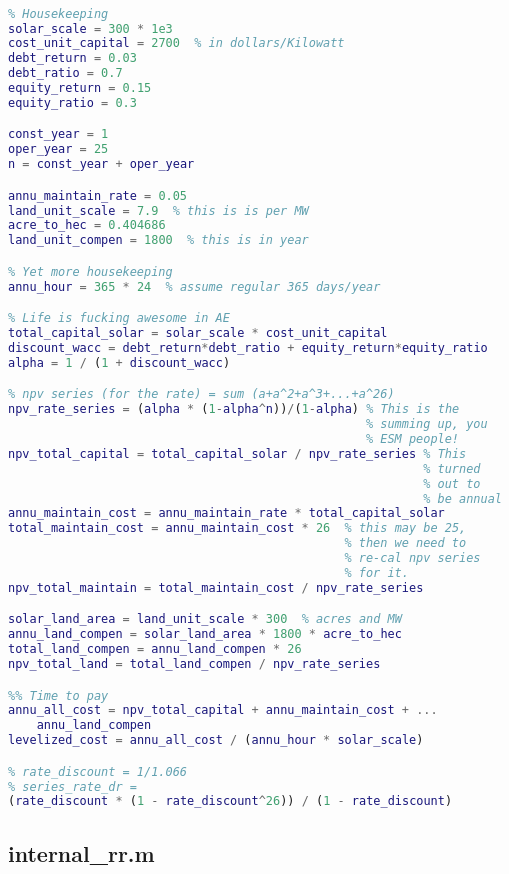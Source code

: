 \documentclass[12pt]{article}
\begin{document}
\begin{lstlisting}[language=Matlab]
%% Levelized cost of energy

% Housekeeping
solar_scale = 300 * 1e3
cost_unit_capital = 2700  % in dollars/Kilowatt
debt_return = 0.03
debt_ratio = 0.7
equity_return = 0.15
equity_ratio = 0.3

const_year = 1
oper_year = 25
n = const_year + oper_year

annu_maintain_rate = 0.05
land_unit_scale = 7.9  % this is is per MW
acre_to_hec = 0.404686
land_unit_compen = 1800  % this is in year

% Yet more housekeeping
annu_hour = 365 * 24  % assume regular 365 days/year

% Life is fucking awesome in AE
total_capital_solar = solar_scale * cost_unit_capital
discount_wacc = debt_return*debt_ratio + equity_return*equity_ratio
alpha = 1 / (1 + discount_wacc)

% npv series (for the rate) = sum (a+a^2+a^3+...+a^26)
npv_rate_series = (alpha * (1-alpha^n))/(1-alpha) % This is the
                                                  % summing up, you
                                                  % ESM people!
npv_total_capital = total_capital_solar / npv_rate_series % This
                                                          % turned
                                                          % out to
                                                          % be annual
annu_maintain_cost = annu_maintain_rate * total_capital_solar
total_maintain_cost = annu_maintain_cost * 26  % this may be 25,
                                               % then we need to
                                               % re-cal npv series
                                               % for it.
npv_total_maintain = total_maintain_cost / npv_rate_series

solar_land_area = land_unit_scale * 300  % acres and MW
annu_land_compen = solar_land_area * 1800 * acre_to_hec
total_land_compen = annu_land_compen * 26
npv_total_land = total_land_compen / npv_rate_series

%% Time to pay
annu_all_cost = npv_total_capital + annu_maintain_cost + ...
    annu_land_compen
levelized_cost = annu_all_cost / (annu_hour * solar_scale)

% rate_discount = 1/1.066
% series_rate_dr = 
(rate_discount * (1 - rate_discount^26)) / (1 - rate_discount)

\end{lstlisting}


\subsection{internal\_rr.m}
\label{sec:internal_rr.m}
\end{document}
